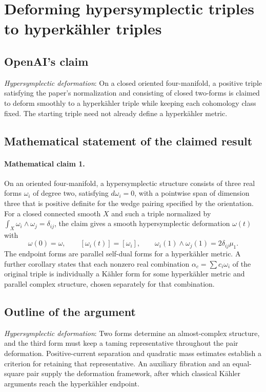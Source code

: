 \documentclass[11pt]{article}
\begin{document}
\section*{Deforming hypersymplectic triples to hyperkähler triples}

\subsection{OpenAI's claim}
\textit{Hypersymplectic deformation}: On a closed oriented four-manifold, a positive triple satisfying the paper’s normalization and consisting of closed two-forms is claimed to deform smoothly to a hyperkähler triple while keeping each cohomology class fixed. The starting triple need not already define a hyperkähler metric.

\subsection{Mathematical statement of the claimed result}
\paragraph{Mathematical claim 1.} On an oriented four-manifold, a hypersymplectic structure consists of three real forms $\omega_i$ of degree two, satisfying $d\omega_i=0$, with a pointwise span of dimension three that is positive definite for the wedge pairing specified by the orientation. For a closed connected smooth $X$ and such a triple normalized by $\int_X\omega_i\wedge\omega_j=\delta_{ij}$, the claim gives a smooth hypersymplectic deformation $\omega(t)$ with \[\omega(0)=\omega,\qquad[\omega_i(t)]=[\omega_i],\qquad\omega_i(1)\wedge\omega_j(1)=2\delta_{ij}\mu_1.\] The endpoint forms are parallel self-dual forms for a hyperk\"ahler metric. A further corollary states that each nonzero real combination $\alpha_c=\sum c_i\omega_i$ of the original triple is individually a K\"ahler form for some hyperk\"ahler metric and parallel complex structure, chosen separately for that combination.

\subsection{Outline of the argument}
\textit{Hypersymplectic deformation}: Two forms determine an almost-complex structure, and the third form must keep a taming representative throughout the pair deformation. Positive-current separation and quadratic mass estimates establish a criterion for retaining that representative. An auxiliary fibration and an equal-square pair supply the deformation framework, after which classical Kähler arguments reach the hyperkähler endpoint.
\end{document}

